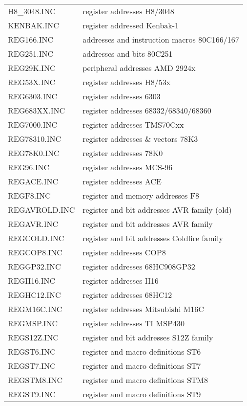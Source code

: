 \documentclass[12pt,twoside]{report}
\begin{document}
\begin{center}
\begin{longtable}{|l|l|}
H8\_3048.INC      & register addresses H8/3048 \\
KENBAK.INC        & register addressed Kenbak-1 \\
REG166.INC        & addresses and instruction macros 80C166/167 \\
REG251.INC        & addresses and bits 80C251 \\
REG29K.INC        & peripheral addresses AMD 2924x \\
REG53X.INC        & register addresses H8/53x \\
REG6303.INC       & register addresses 6303 \\
REG683XX.INC      & register addresses 68332/68340/68360 \\
REG7000.INC       & register addresses TMS70Cxx \\
REG78310.INC      & register addresses \& vectors 78K3 \\
REG78K0.INC       & register addresses 78K0 \\
REG96.INC         & register addresses MCS-96 \\
REGACE.INC        & register addresses ACE \\
REGF8.INC         & register and memory addresses F8 \\
REGAVROLD.INC     & register and bit addresses AVR family (old)\\
REGAVR.INC        & register and bit addresses AVR family \\
REGCOLD.INC       & register and bit addresses Coldfire family \\
REGCOP8.INC       & register addresses COP8 \\
REGGP32.INC       & register addresses 68HC908GP32 \\
REGH16.INC        & register addresses H16\\
REGHC12.INC       & register addresses 68HC12 \\
REGM16C.INC       & register addresses Mitsubishi M16C \\
REGMSP.INC        & register addresses TI MSP430 \\
REGS12Z.INC       & register and bit addresses S12Z family \\
REGST6.INC        & register and macro definitions ST6 \\
REGST7.INC        & register and macro definitions ST7 \\
REGSTM8.INC       & register and macro definitions STM8 \\
REGST9.INC        & register and macro definitions ST9 \\

\end{longtable}
\end{center}
\end{document}
